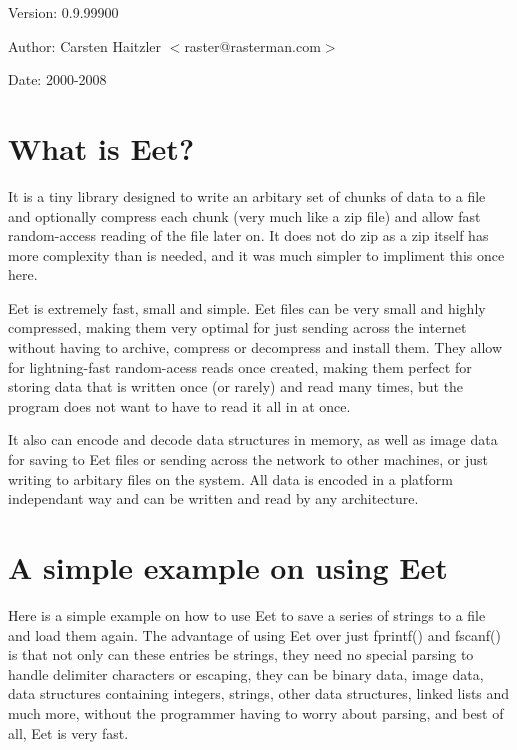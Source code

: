  \begin{Desc}
\item[Version:]0.9.99900 \end{Desc}
\begin{Desc}
\item[Author:]Carsten Haitzler $<$raster@rasterman.com$>$ \end{Desc}
\begin{Desc}
\item[Date:]2000-2008\end{Desc}
\hypertarget{index_intro}{}\section{What is Eet?}\label{index_intro}
It is a tiny library designed to write an arbitary set of chunks of data to a file and optionally compress each chunk (very much like a zip file) and allow fast random-access reading of the file later on. It does not do zip as a zip itself has more complexity than is needed, and it was much simpler to impliment this once here.

Eet is extremely fast, small and simple. Eet files can be very small and highly compressed, making them very optimal for just sending across the internet without having to archive, compress or decompress and install them. They allow for lightning-fast random-acess reads once created, making them perfect for storing data that is written once (or rarely) and read many times, but the program does not want to have to read it all in at once.

It also can encode and decode data structures in memory, as well as image data for saving to Eet files or sending across the network to other machines, or just writing to arbitary files on the system. All data is encoded in a platform independant way and can be written and read by any architecture.\hypertarget{index_example}{}\section{A simple example on using Eet}\label{index_example}
Here is a simple example on how to use Eet to save a series of strings to a file and load them again. The advantage of using Eet over just fprintf() and fscanf() is that not only can these entries be strings, they need no special parsing to handle delimiter characters or escaping, they can be binary data, image data, data structures containing integers, strings, other data structures, linked lists and much more, without the programmer having to worry about parsing, and best of all, Eet is very fast.



